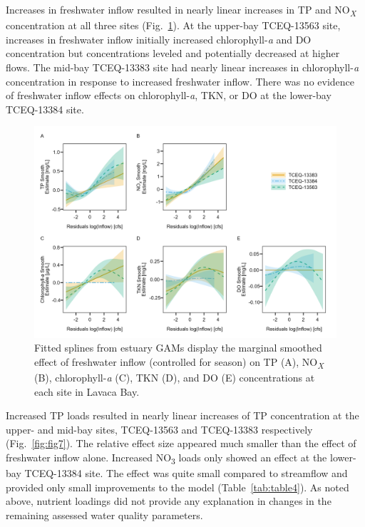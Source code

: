 \documentclass[fleqn,10pt,lineno]{wlpeerj} %
\begin{document}
Increases in freshwater inflow resulted in nearly linear increases in TP
and NO\textsubscript{\emph{X}} concentration at all three sites
(Fig.~\ref{fig:fig6}). At the upper-bay TCEQ-13563 site, increases in
freshwater inflow initially increased chlorophyll-\emph{a} and DO
concentration but concentrations leveled and potentially decreased at
higher flows. The mid-bay TCEQ-13383 site had nearly linear increases in
chlorophyll-\emph{a} concentration in response to increased freshwater
inflow. There was no evidence of freshwater inflow effects on
chlorophyll-\emph{a}, TKN, or DO at the lower-bay TCEQ-13384 site.

\begin{figure}

{\centering \includegraphics[width=1\linewidth,]{Schramm-2023-06-PeerJ_files/figure-latex/fig6-1} 

}

\caption{Fitted splines from estuary GAMs display the marginal smoothed effect of freshwater inflow (controlled for season) on TP (A), NO\textit{\textsubscript{X}} (B), chlorophyll-\textit{a} (C), TKN (D), and DO (E) concentrations at each site in Lavaca Bay.}\label{fig:fig6}
\end{figure}

Increased TP loads resulted in nearly linear increases of TP
concentration at the upper- and mid-bay sites, TCEQ-13563 and TCEQ-13383
respectively (Fig.~\ref{fig:fig7}). The relative effect size appeared
much smaller than the effect of freshwater inflow alone. Increased
NO\textsubscript{3} loads only showed an effect at the lower-bay
TCEQ-13384 site. The effect was quite small compared to streamflow and
provided only small improvements to the model (Table~\ref{tab:table4}).
As noted above, nutrient loadings did not provide any explanation in
changes in the remaining assessed water quality parameters.
\end{document}
